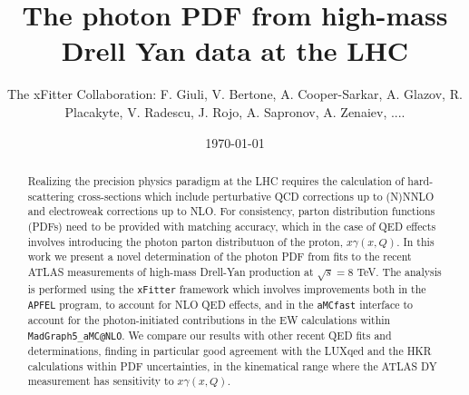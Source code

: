 \documentclass[english,aps]{revtex4-1}
\begin{document}
\linenumbers

\title{The photon PDF from high-mass Drell Yan data at the LHC}

\author{The xFitter Collaboration: F. Giuli, V. Bertone, A. Cooper-Sarkar, A. Glazov, R. Placakyte, V. Radescu,  J. Rojo, A. Sapronov, A. Zenaiev, .... }

\date{\today}
\begin{abstract}
  Realizing the precision physics paradigm at the LHC requires the calculation
   of  hard-scattering
   cross-sections which include perturbative QCD corrections up to (N)NNLO
   and electroweak corrections up to NLO.
   For consistency, parton distribution functions (PDFs) need to be provided
   with matching accuracy, which in the case of QED effects involves introducing
   the photon parton distributuon of the proton, $x\gamma(x,Q)$.
   In this work we present a novel determination of the photon PDF from fits to 
   the recent ATLAS measurements of high-mass Drell-Yan production at $\sqrt{s}=8$ TeV.
  The analysis is  performed  using the {\tt xFitter} framework which involves
  improvements both in the {\tt APFEL} program, to account for NLO QED effects,
  and in the {\tt aMCfast} interface to account for the  photon-initiated contributions
  in the EW calculations within {\tt MadGraph5\_aMC@NLO}.
  We compare our results with other recent QED fits
  and determinations, finding in particular
  good agreement with the LUXqed and the HKR calculations within PDF uncertainties,
  in the kinematical range where the ATLAS DY measurement has sensitivity to
  $x\gamma(x,Q)$.
\end{abstract}
\maketitle
\tableofcontents{}












\end{document}
